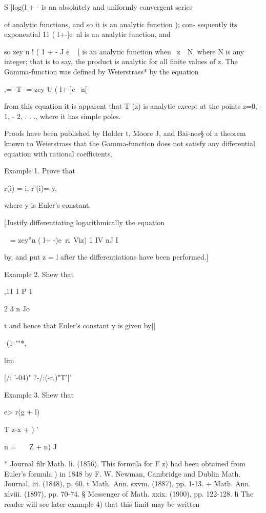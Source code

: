 %
%

S ]log(l + - is an absolutely and uniformly convergent series

of analytic functions, and so it is an analytic function );
con- sequently its exponential 11 ( l+-]e~nl is an analytic function,
and

so zey n ! ( 1 + - J e ~ [ is an analytic function when \ z\ \ N,
where N is any integer; that is to say, the product is analytic for
all finite values of z. The Gamma-function was defined by Weierstrass*
by the equation

,= -T- = zey U ( l+-]e ~n[-

from this equation it is apparent that T (z) is analytic except at the
points z=0, - 1, - 2, . . ., where it has simple poles.

Proofs have been published by Holder t, Moore J, and Bai-nes§ of a
theorem known to Weierstrass that the Gamma-function does not satisfy
any differential equation with rational coefficients.

Example 1. Prove that

r(i) = i, r'(i)=-y,

where y is Euler's constant.

[Justify differentiating logarithmically the equation

~ = zey''n ( l+ -)e~ri\ Viz) 1 IV nJ I

by, and put z = l after the differentiations have been
performed.]

Example 2. Shew that

,11 1 P 1

2 3 n Jo

t and hence that Euler's constant y is given by||

-(1-""*,

lim

[/: '-04)" ?-/:(-r.)"T']'

Example 3. Shew that

e> r(g + l)

T z-x + ) '

n = \ \ \ Z + n) J

* Journal filr Math. li. (1856). This formula for F z) had been
obtained from Euler's formula ) in 1848 by F. W. Newman,
Cambridge and Dublin Math. Journal, iii. (1848), p. 60. t Math. Ann.
sxvm. (1887), pp. 1-13. + Math. Ann. xlviii. (1897), pp. 70-74. §
Messenger of Math. xxix. (1900), pp. 122-128. li The reader will see
later  example 4) that this limit may be written

